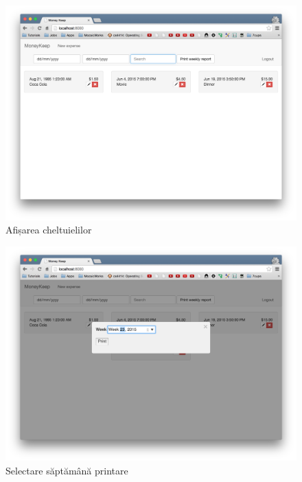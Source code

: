 \begin{figure}
  \includegraphics[width=1\textwidth]{./chap5-files/main_page}
  \caption{Afișarea cheltuielilor}
\end{figure}

\begin{figure}
  \includegraphics[width=1\textwidth]{./chap5-files/print_weekly1}
  \caption{Selectare săptămână printare}
\end{figure}

